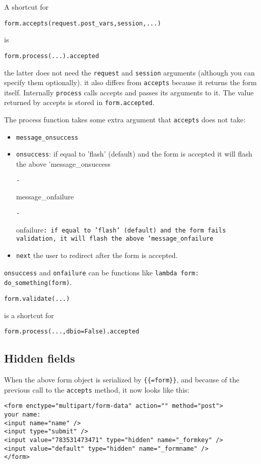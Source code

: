 \documentclass[justified,sixbynine,notoc]{tufte-book}
\def\ft{\small\tt}
\begin{document}
\begin{fullwidth}
A shortcut for
\begin{lstlisting}
form.accepts(request.post_vars,session,...)
\end{lstlisting}
is
\begin{lstlisting}
form.process(...).accepted
\end{lstlisting}
the latter does not need the {\ft request} and {\ft session} arguments (although you can specify them optionally). it also differs from {\ft accepts} because it returns the form itself. Internally {\ft process} calls accepts and passes its arguments to it. The value returned by accepts is stored in {\ft form.accepted}.

The process function takes some extra argument that {\ft accepts} does not take:
\begin{itemize}
\item {\ft message\_onsuccess}

\item {\ft onsuccess}: if equal to 'flash' (default) and the form is accepted it will flash the above 'message\_onsuccess\begin{lstlisting}
- 
\end{lstlisting}message\_onfailure\begin{lstlisting}
- 
\end{lstlisting}onfailure{\ft : if equal to 'flash' (default) and the form fails validation, it will flash the above `message\_onfailure}

\item {\ft next} the user to redirect after the form is accepted.
\end{itemize}
{\ft onsuccess} and {\ft onfailure} can be functions like {\ft lambda form: do\_something(form)}.

\begin{lstlisting}
form.validate(...)
\end{lstlisting}
\noindent is a shortcut for

\begin{lstlisting}
form.process(...,dbio=False).accepted
\end{lstlisting}

\goodbreak\subsection{Hidden fields}

When the above form object is serialized by {\ft \{\{=form\}\}}, and because of the previous call to the {\ft accepts} method, it now looks like this:
\begin{lstlisting}[keywords={}]
<form enctype="multipart/form-data" action="" method="post">
your name:
<input name="name" />
<input type="submit" />
<input value="783531473471" type="hidden" name="_formkey" />
<input value="default" type="hidden" name="_formname" />
</form>
\end{lstlisting}


\end{fullwidth}
\end{document}
